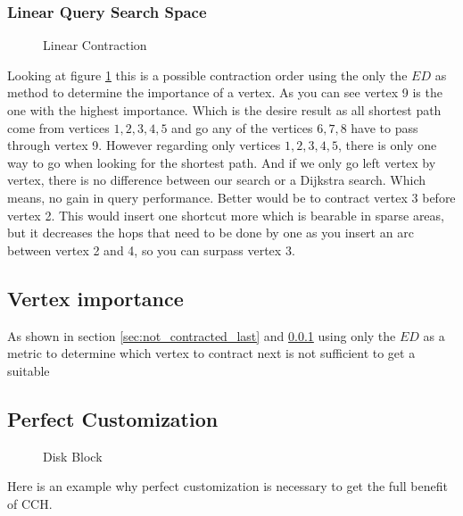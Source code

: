 \subsubsection{Linear Query Search Space}\label{sec:linear_query}

\begin{figure}
\centering

\caption{Linear Contraction}
\label{fig:linear_contraction}
\end{figure}

Looking at figure \ref{fig:linear_contraction} this is a possible contraction order using the only the $ED$ as method to determine the importance of a vertex. As you can see vertex 9 is the one with the highest importance. Which is the desire result as all shortest path come from vertices ${1, 2, 3, 4, 5}$ and go any of the vertices ${6, 7, 8}$ have to pass through vertex 9. However regarding only vertices $1, 2, 3, 4, 5$, there is only one way to go when looking for the shortest path. And if we only go left vertex by vertex, there is no difference between our search or a Dijkstra search. Which means, no gain in query performance. Better would be to contract vertex 3 before vertex 2. This would insert one shortcut more which is bearable in sparse areas, but it decreases the hops that need to be done by one as you insert an arc between vertex 2 and 4, so you can surpass vertex 3. 

\subsection{Vertex importance}\label{sec:vertex_importance}

As shown in section \ref{sec:not_contracted_last} and \ref{sec:linear_query} using only the $ED$ as a metric to determine which vertex to contract next is not sufficient to get a suitable

\subsection{Perfect Customization}

\begin{figure}
    \centering
    
    \caption{Disk Block}
    \label{fig:perfectCustomization}
\end{figure}

Here is an example why perfect customization is necessary to get the full
benefit of CCH.


